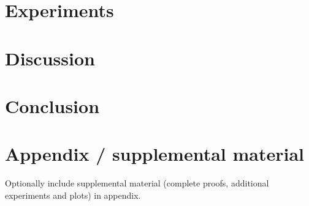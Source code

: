 \documentclass{article}
\begin{document}
\section{Experiments}

\section{Discussion}

\section{Conclusion}





\appendix
\section{Appendix / supplemental material}

Optionally include supplemental material (complete proofs, additional experiments and plots) in appendix.
\end{document}
